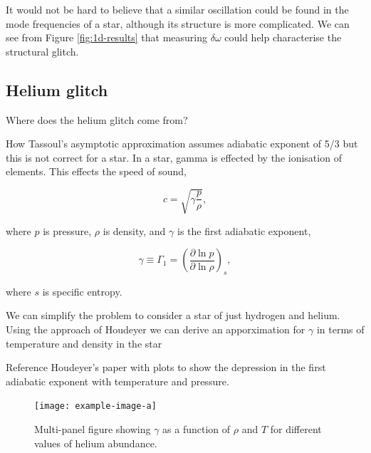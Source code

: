 It would not be hard to believe that a similar oscillation could be found in the mode frequencies of a star, although its structure is more complicated. We can see from Figure \ref{fig:1d-results} that measuring \(\delta\omega\) could help characterise the structural glitch.



\subsection{Helium glitch}\label{sec:helium-glitch}

Where does the helium glitch come from?

How Tassoul's asymptotic approximation assumes adiabatic exponent of 5/3 but this is not correct for a star. In a star, gamma is effected by the ionisation of elements. This effects the speed of sound,

\begin{equation}
    c = \sqrt{\gamma \frac{p}{\rho}},
\end{equation}

where \(p\) is pressure, \(\rho\) is density, and \(\gamma\) is the first adiabatic exponent,

\begin{equation}
    \gamma \equiv \Gamma_1 = \left( \frac{\partial \ln p}{\partial \ln \rho} \right)_s,
\end{equation}

where \(s\) is specific entropy.

We can simplify the problem to consider a star of just hydrogen and helium. Using the approach of Houdeyer we can derive an apporximation for \(\gamma\) in terms of temperature and density in the star

Reference Houdeyer's paper with plots to show the depression in the first adiabatic exponent with temperature and pressure. 

\begin{figure}
    \centering
    \texttt{[image: example-image-a]}
    \caption{Multi-panel figure showing \(\gamma\) as a function of \(\rho\) and \(T\) for different values of helium abundance.}
    \label{fig:gamma-temp-density}
\end{figure}

